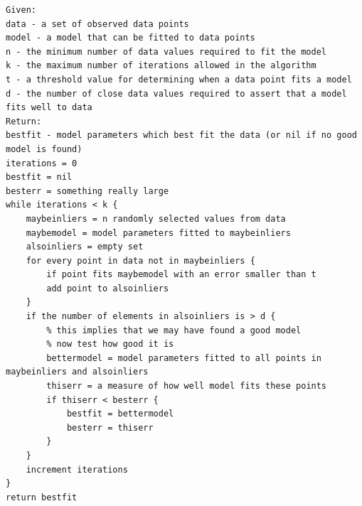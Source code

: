 \begin{lstlisting}
Given:
data - a set of observed data points
model - a model that can be fitted to data points
n - the minimum number of data values required to fit the model
k - the maximum number of iterations allowed in the algorithm
t - a threshold value for determining when a data point fits a model
d - the number of close data values required to assert that a model fits well to data
Return:
bestfit - model parameters which best fit the data (or nil if no good model is found)
iterations = 0
bestfit = nil
besterr = something really large
while iterations < k {
	maybeinliers = n randomly selected values from data
	maybemodel = model parameters fitted to maybeinliers
	alsoinliers = empty set
	for every point in data not in maybeinliers {
		if point fits maybemodel with an error smaller than t
		add point to alsoinliers
	}
	if the number of elements in alsoinliers is > d {
		% this implies that we may have found a good model
		% now test how good it is
		bettermodel = model parameters fitted to all points in maybeinliers and alsoinliers
		thiserr = a measure of how well model fits these points
		if thiserr < besterr {
			bestfit = bettermodel
			besterr = thiserr
		}
	}
	increment iterations
}
return bestfit


\end{lstlisting}

